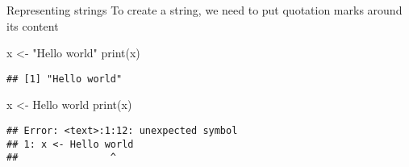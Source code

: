 \documentclass[
  10pt,
  ignorenonframetext,
  aspectratio=169]{beamer}
\newenvironment{Shaded}{\begin{snugshade}}{\end{snugshade}}
\newcommand{\FunctionTok}[1]{\textcolor[rgb]{0.94,0.94,0.56}{#1}}
\newcommand{\NormalTok}[1]{\textcolor[rgb]{0.80,0.80,0.80}{#1}}
\newcommand{\OtherTok}[1]{\textcolor[rgb]{0.94,0.94,0.56}{#1}}
\newcommand{\StringTok}[1]{\textcolor[rgb]{0.80,0.58,0.58}{#1}}
\begin{document}
\begin{frame}[fragile]{Representing strings}
\protect\hypertarget{representing-strings}{}
To create a string, we need to put quotation marks around its content

\begin{Shaded}
\begin{Highlighting}[]
\NormalTok{x }\OtherTok{\textless{}{-}} \StringTok{"Hello world"}
\FunctionTok{print}\NormalTok{(x)}
\end{Highlighting}
\end{Shaded}

\begin{verbatim}
## [1] "Hello world"
\end{verbatim}

\begin{Shaded}
\begin{Highlighting}[]
\NormalTok{x }\OtherTok{\textless{}{-}}\NormalTok{ Hello world}
\FunctionTok{print}\NormalTok{(x)}
\end{Highlighting}
\end{Shaded}

\begin{verbatim}
## Error: <text>:1:12: unexpected symbol
## 1: x <- Hello world
##                ^
\end{verbatim}
\end{frame}
\end{document}
